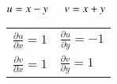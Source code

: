 \documentclass[11pt]{extarticle}
\begin{document}
\begin{minipage}[t]{0.37\linewidth}
\noindent

      

      $u=x-y \ \ \ \ \ \  v=x+y$

      \vspace{2ex}
      \begin{tabular}{ll}
         $\frac{\partial u}{\partial x}=1$ & \hspace{0.5em}
         $\frac{\partial u}{\partial y}=-1$ \\[2ex]
         $\frac{\partial v}{\partial x}=1$ & \hspace{0.5em}
         $\frac{\partial v}{\partial y}=1$
      \end{tabular}


\end{minipage}
\end{document}
